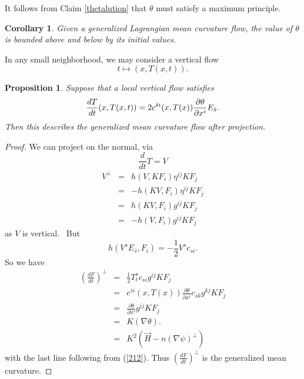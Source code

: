 \documentclass[12pt,letterpaper]{amsart}%
\newcounter{mycounter}
\numberwithin{mycounter}{section}
\theoremstyle{plain}
\newtheorem{corollary}[mycounter]{Corollary}
\newtheorem{proposition}[mycounter]{Proposition}
\numberwithin{equation}{section}
\theoremstyle{definition}
\begin{document}
It follows from Claim \ref{thetalution} that $\theta$ must satisfy a maximum principle. 

\begin{corollary} \label{thetamaxprinciple}
    Given a generalized Lagrangian mean curvature flow, the value of $\theta$ is bounded above and below by its initial values. 
\end{corollary}

\iffalse
In any small neighborhood, we may consider a vertical flow 
\begin{equation*}
t\mapsto (x,T(x,t)).
\end{equation*}

\begin{proposition}
Suppose that a local vertical flow satisfies 
\begin{equation*}
\frac{dT}{dt}(x,T(x,t))=2c^{\bar{s}i}(x,T(x))\frac{\partial \theta }{%
\partial x^{i}}E_{\bar{s}}.
\end{equation*}%
Then this describes the generalized mean curvature flow after projection. \ 
\end{proposition}

\begin{proof}
We can project on the normal, via%
\begin{equation*}
\frac{d}{dt}T=V
\end{equation*}
\begin{eqnarray*}
V^{\perp } &=&h(V,KF_{i})\eta ^{ij}KF_{j} \\
&=&-h(KV,F_{i})\eta ^{ij}KF_{j} \\
&=&h(KV,F_{i})g^{ij}KF_{j} \\
&=&-h(V,F_{i})g^{ij}KF_{j}
\end{eqnarray*}%
as $V$ is vertical. \ But 
\begin{equation*}
h(V^{s}E_{\bar{s}},F_{i})=-\frac{1}{2}V^{s}c_{si}.
\end{equation*}%
So we have 
\begin{eqnarray*}
\left( \frac{dF}{dt}\right) ^{\perp } &=&\frac{1}{2}%
T_{t}^{s}c_{si}g^{ij}KF_{j} \\
&=&c^{\bar{s}i}(x,T(x))\frac{\partial \theta }{\partial x^{i}}%
c_{sk}g^{kj}KF_{j} \\
&=&\frac{\partial \theta }{\partial x^{i}}g^{ij}KF_{j} \\
&=&K\left( \nabla \theta \right) . \\
&=&K^{2}(\vec{H}-n\left( \nabla \psi \right) ^{\perp })
\end{eqnarray*}%
with the last line following from (\ref{212}). Thus $\left( \frac{dF}{dt}%
\right) ^{\perp }$ is the generalized mean curvature.
\end{proof}
\end{document}
